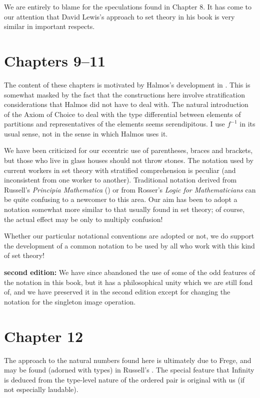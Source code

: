 We are entirely to blame for the speculations found in Chapter 8.  It
has come to our attention that David Lewis's approach to set theory in
his book \cite{lewis} is very similar in important respects.

\section*{Chapters 9--11}

The content of these chapters is motivated by Halmos's development in
\cite{halmos}.  This is somewhat masked by the fact that the
constructions here involve stratification considerations
that Halmos did not have to deal with.  The natural introduction of the Axiom
of Choice to deal with the type
differential between elements of partitions and
representatives of the elements seems serendipitous.  I 
use $f^{-1}$ in its usual sense, not in the sense in which Halmos uses
it.

We have been criticized for our eccentric use of parentheses, braces
and brackets, but those who live in glass houses should not throw
stones.  The notation used by current workers in set theory with
stratified comprehension is peculiar
(and inconsistent from one 
worker to another).  Traditional notation derived from Russell's {\itshape
Principia Mathematica\/} (\cite{russell}) or from Rosser's {\itshape Logic
for Mathematicians\/} can be quite confusing to a newcomer to this
area.  Our aim has been to adopt a notation somewhat more similar to
that usually found in set theory; of course, the actual effect may be
only to multiply confusion!

Whether our particular notational conventions are adopted or not, we
do support the development of a common notation to be used by all who
work with this kind of set theory!

{\bf second edition:}  We have since abandoned the use of some of the odd features of the notation in this book, but it has a philosophical unity which we are still fond of, and we have preserved it in the second edition except for changing the notation for the singleton image operation.


\section*{Chapter 12}

The approach to the natural numbers found here is
ultimately due to Frege, and may be found (adorned with types) in Russell's \cite{russell}.  The special feature that
Infinity is deduced from the type-level nature of the ordered pair is original with us
(if not especially laudable).

